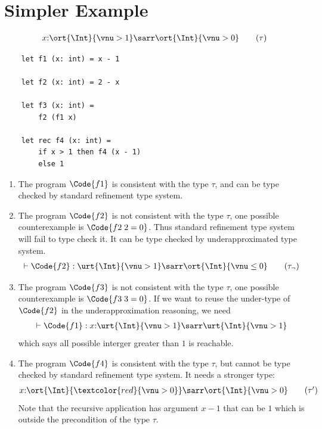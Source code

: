 \section{Simpler Example}

\begin{align*}
    x{:}\ort{\Int}{\vnu > 1} \sarr \ort{\Int}{\vnu > 0} \tag{$\tau$}
\end{align*}\noindent

\begin{verbatim}
    let f1 (x: int) = x - 1

    let f2 (x: int) = 2 - x

    let f3 (x: int) =
        f2 (f1 x)

    let rec f4 (x: int) =
        if x > 1 then f4 (x - 1)
        else 1
\end{verbatim}

\begin{enumerate}
    \item The program $\Code{f1}$ is consistent with the type $\tau$, and can be type checked by standard refinement type system.
    \item The program $\Code{f2}$ is not consistent with the type $\tau$, one possible counterexample is $\Code{f2\;2 = 0}$. Thus standard refinement type system will fail to type check it. It can be type checked by underapproximated type system.
    \begin{align*}
        \vdash \Code{f2} : \urt{\Int}{\vnu > 1} \sarr \ort{\Int}{\vnu \leq 0} \tag{$\tau_{\neg}$}
    \end{align*}\noindent
    \item The program $\Code{f3}$ is not consistent with the type $\tau$, one possible counterexample is $\Code{f3\;3 = 0}$. If we want to reuse the under-type of $\Code{f2}$ in the underapproximation reasoning, we need
    \begin{align*}
        \vdash \Code{f1} : x{:}\urt{\Int}{\vnu > 1} \sarr \urt{\Int}{\vnu > 1}
    \end{align*}\noindent
    which says all possible interger greater than $1$ is reachable.
    \item The program $\Code{f4}$ is consistent with the type $\tau$, but cannot be type checked by standard refinement type system. It needs a stronger type:
    \begin{align*}
        x{:}\ort{\Int}{\textcolor{red}{\vnu > 0}} \sarr \ort{\Int}{\vnu > 0} \tag{$\tau'$}
    \end{align*}\noindent
    Note that the recursive application has argument $x - 1$ that can be $1$ which is outside the precondition of the type $\tau$.
\end{enumerate}

